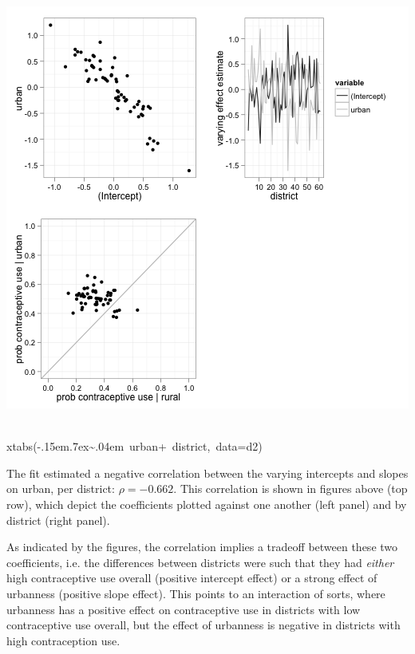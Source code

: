 \documentclass{article}
\makeatletter
\newcommand{\hlcomment}[1]{\textcolor[rgb]{.18,.6,.34}{#1}}%
\def\urltilda{\kern -.15em\lower .7ex\hbox{\~{}}\kern .04em}%
\newcommand{\hlstd}[1]{\textcolor[rgb]{0,0,0}{#1}}%
\newenvironment{kframe}{%
 \def\FrameCommand##1{\hskip\@totalleftmargin \hskip-\fboxsep
 \colorbox{shadecolor}{##1}\hskip-\fboxsep
     \hskip-\linewidth \hskip-\@totalleftmargin \hskip\columnwidth}%
 \MakeFramed {\advance\hsize-\width
   \@totalleftmargin\z@ \linewidth\hsize
   \@setminipage}}%
 {\par\unskip\endMakeFramed}
\newenvironment{knitrout}{}{} %
\makeatother
\begin{document}
\begin{knitrout}
{\begin{kframe}
\includegraphics{urban-model} \begin{flushleft}
\ttfamily\noindent
\hspace*{\fill}\\
\hlstd{}\hlcomment{\usebox{\hlnormalsizeboxhash}xtabs(\urltilda{}{\ }urban+{\ }district,{\ }data=d2)}\mbox{}
\normalfont
\end{flushleft}
\end{kframe}}
\end{knitrout}


The fit estimated a negative correlation between the varying intercepts and slopes on urban, per district:  $\rho = - 0. 662$. 
This correlation is shown in figures above (top row), which depict the coefficients plotted against one another (left panel) and by district (right panel).

As indicated by the figures, the correlation implies a tradeoff between these two coefficients, i.e. the differences between districts were such that they had {\em either} high contraceptive use overall (positive intercept effect) or a strong effect of urbanness (positive slope effect). 
This points to an interaction of sorts, where urbanness has a positive effect on contraceptive use in districts with low contraceptive use overall, but the effect of urbanness is negative in districts with high contraception use.
\end{document}
